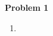 \documentclass[12pt]{article}
\begin{document}
\textbf{Problem 1}
\begin{enumerate}[label=(\alph*)]
    \item
\end{enumerate}

\end{document}
